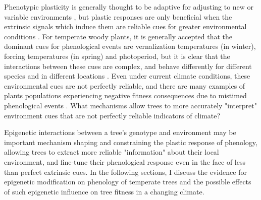 \documentclass{article}\usepackage[]{graphicx}\usepackage[]{color}
\begin{document}
\par  Phenotypic plasticity is generally thought to be adaptive for adjusting to new or variable environments \citep{Crispo2007}, but plastic responses are only beneficial when the extrinsic signals which induce them are reliable cues for greater environmental conditions \citep{Hendry2015}. For temperate woody plants, it is generally accepted that the dominant cues for phenological events are vernalization temperatures (in winter), forcing temperatures (in spring) and photoperiod, but it is clear that the interactions between these cues are complex, and behave differently for different species and in different locations \citep{Forrest2010}. Even under current climate conditions, these environmental cues are not perfectly reliable, and there are many examples of plants populations experiencing negative fitness consequences due to mistimed phenological events \cite{Inouye2008}. What mechanisms allow trees to more accurately "interpret" environment cues that are not perfectly reliable indicators of climate?
\par Epigenetic interactions between a tree's genotype and environment may be important mechanism shaping and constraining the plastic response of phenology, allowing trees to extract more reliable "information" about their local environment, and fine-tune their phenological response even in the face of less than perfect extrinsic cues. In the following sections, I discuss the evidence for epigenetic modification on phenology of temperate trees and the possible effects of such epigenetic influence on tree fitness in a changing climate.
\end{document}
